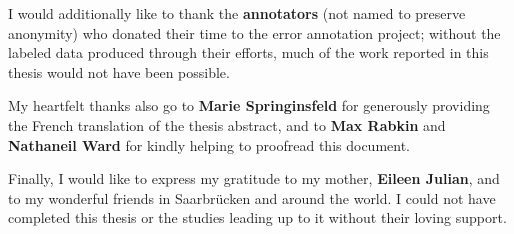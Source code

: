I would additionally like to thank the \textbf{annotators} (not named to preserve anonymity) who donated their time to the error annotation project; without the labeled data produced through their efforts, much of the work reported in this thesis would not have been possible.

My heartfelt thanks also go to \textbf{Marie Springinsfeld} for generously providing the French translation of the thesis abstract, and to \textbf{Max Rabkin} and \textbf{Nathaneil Ward} for kindly helping to proofread this document.

Finally, I would like to express my gratitude to 
my mother, \textbf{Eileen Julian}, and to {my wonderful friends} in Saarbrücken and around the world.
I could not have completed this thesis or the studies leading up to it without 
their loving support.